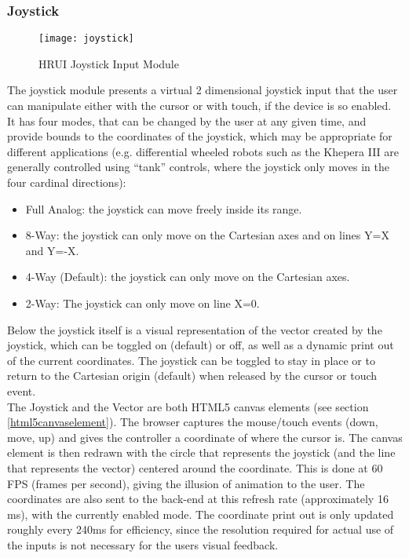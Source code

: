 \subsubsection{Joystick} \label{joystick}
\begin{figure}[H]
\centering
\captionsetup{justification=centering}
\texttt{[image: joystick]}
\caption{HRUI Joystick Input Module}
\end{figure}
The joystick module presents a virtual 2 dimensional joystick input that the user can manipulate either with the cursor or 
with touch, if the device is so enabled. It has four modes, that can be changed by the user at any given time, and provide 
bounds to the coordinates of the joystick, which may be appropriate for different applications (e.g. differential wheeled 
robots such as the Khepera III are generally controlled using ``tank'' controls, where the joystick only moves in the four 
cardinal directions):
\begin{itemize}
	\item Full Analog: the joystick can move freely inside its range.
	\item 8-Way: the joystick can only move on the Cartesian axes and on lines Y=X and Y=-X.
	\item 4-Way (Default): the joystick can only move on the Cartesian axes.
	\item 2-Way: The joystick can only move on line X=0.
\end{itemize}
Below the joystick itself is a visual representation of the vector created by the joystick, which can be toggled on (default) 
or off, as well as a dynamic print out of the current coordinates. The joystick can be toggled to stay in place or to return 
to the Cartesian origin (default) when released by the cursor or touch event.\\

The Joystick and the Vector are both HTML5 canvas elements (see section \ref{html5canvaselement}). The browser captures the 
mouse/touch events (down, move, up) and gives the controller a coordinate of where the cursor is. The canvas element is then 
redrawn with the circle that represents the joystick (and the line that represents the vector) centered around the coordinate. 
This is done at 60 FPS (frames per second), giving the illusion of animation to the user. The coordinates are also sent to the 
back-end at this refresh rate (approximately 16 ms), with the currently enabled mode. The coordinate print out is only updated 
roughly every 240ms for efficiency, since the resolution required for actual use of the inputs is not necessary for the users 
visual feedback.\\

